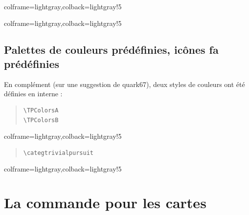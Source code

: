 \documentclass[11pt,a4paper]{ltxdoc}
\begin{document}
\begin{tcblisting}{colframe=lightgray,colback=lightgray!5}
\PlateauTrivialPursuit[Unite=0.5,Vide]
\PlateauTrivialPursuit[Unite=0.5,Logo=false,Centre=false,IconeJoker=\faAward]
\end{tcblisting}

\begin{tcblisting}{colframe=lightgray,colback=lightgray!5}
\PlateauTrivialPursuit[%
	Jokers=false,%
	ListeCouleurs={%
		blue!25,red!25,teal!25,orange!25,gray!50,violet!25},%
	ListeIcones={%
		\faAddressCard,\faAngleDoubleRight,\faAngry[regular],%
		\faAtom,\faBalanceScaleLeft,\faBell}
]
\end{tcblisting}

\pagebreak

\subsection{Palettes de couleurs prédéfinies, icônes fa prédéfinies}

En complément (sur une suggestion de \textsf{quark67}), deux styles de couleurs ont été définies en interne :

\begin{quote}
\begin{verbatim}
\TPColorsA
\TPColorsB
\end{verbatim}
\end{quote}

\begin{tcblisting}{colframe=lightgray,colback=lightgray!5}
\PlateauTrivialPursuit[Unite=0.5,ListeCouleurs=\TPColorsA]
\PlateauTrivialPursuit[Unite=0.5,ListeCouleurs=\TPColorsB]
\end{tcblisting}

\begin{quote}
\begin{verbatim}
\categtrivialpursuit
\end{verbatim}
\end{quote}

\begin{tcblisting}{colframe=lightgray,colback=lightgray!5}
\PlateauTrivialPursuit%
  [ListeIcones=\categtrivialpursuit,ListeCouleurs=\TPColorsB,IconeJoker=\faDice]
\end{tcblisting}

\pagebreak

\section{La commande pour les cartes}
\end{document}
